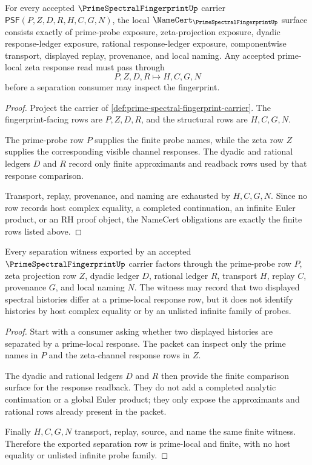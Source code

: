 \begin{theorem}
\label{thm:prime-spectral-fingerprint-namecert-obligations}
For every accepted $\PrimeSpectralFingerprintUp$ carrier $\mathsf{PSF}(P,Z,D,R,H,C,G,N)$, the local $\NameCert_{\PrimeSpectralFingerprintUp}$ surface consists exactly of prime-probe exposure, zeta-projection exposure, dyadic response-ledger exposure, rational response-ledger exposure, componentwise transport, displayed replay, provenance, and local naming. Any accepted prime-local zeta response read must pass through
$$
P,Z,D,R \longmapsto H,C,G,N
$$
before a separation consumer may inspect the fingerprint.
\end{theorem}
\begin{proof}
Project the carrier of \autoref{def:prime-spectral-fingerprint-carrier}. The fingerprint-facing rows are $P,Z,D,R$, and the structural rows are $H,C,G,N$.

The prime-probe row $P$ supplies the finite probe names, while the zeta row $Z$ supplies the corresponding visible channel responses. The dyadic and rational ledgers $D$ and $R$ record only finite approximants and readback rows used by that response comparison.

Transport, replay, provenance, and naming are exhausted by $H,C,G,N$. Since no row records host complex equality, a completed continuation, an infinite Euler product, or an RH proof object, the NameCert obligations are exactly the finite rows listed above.
\end{proof}

\begin{theorem}
\label{thm:prime-spectral-fingerprint-separation-witness}
Every separation witness exported by an accepted $\PrimeSpectralFingerprintUp$ carrier factors through the prime-probe row $P$, zeta projection row $Z$, dyadic ledger $D$, rational ledger $R$, transport $H$, replay $C$, provenance $G$, and local naming $N$. The witness may record that two displayed spectral histories differ at a prime-local response row, but it does not identify histories by host complex equality or by an unlisted infinite family of probes.
\end{theorem}
\begin{proof}
Start with a consumer asking whether two displayed histories are separated by a prime-local response. The packet can inspect only the prime names in $P$ and the zeta-channel response rows in $Z$.

The dyadic and rational ledgers $D$ and $R$ then provide the finite comparison surface for the response readback. They do not add a completed analytic continuation or a global Euler product; they only expose the approximants and rational rows already present in the packet.

Finally $H,C,G,N$ transport, replay, source, and name the same finite witness. Therefore the exported separation row is prime-local and finite, with no host equality or unlisted infinite probe family.
\end{proof}

